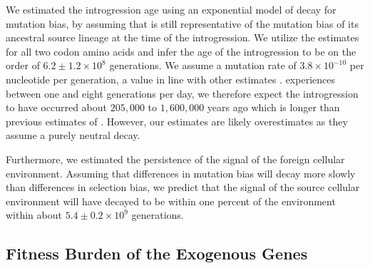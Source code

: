 \documentclass[12pt]{article}
\begin{document}
We estimated the introgression age using an exponential model of decay for mutation bias, by assuming that \gossypii is still representative of the mutation bias of its ancestral source lineage at the time of the introgression.
We utilize the \DM estimates for all two codon amino acids and infer the age of the introgression to be on the order of $6.2\pm1.2\times 10^8$ generations. 
We assume a mutation rate of $3.8\times 10^{-10}$ per nucleotide per generation, a value in line with other estimates \citep{zhu2014, lang2008}.
\kluyveri experiences between one and eight generations per day, we therefore expect the introgression to have occurred about $205,000$ to $1,600,000$ years ago which is  longer than previous estimates of \citet{friedrich2015}.
However, our estimates are likely overestimates as they assume a purely neutral decay.

Furthermore, we estimated the persistence of the signal of the foreign cellular environment.
Assuming that differences in mutation bias will decay more slowly than differences in selection bias, we predict that the \DM signal of the source cellular environment will have decayed to be within one percent of the \kluyveri environment within about $5.4\pm0.2\times 10^9 $ generations.


\subsection*{Fitness Burden of the Exogenous Genes}
\end{document}
